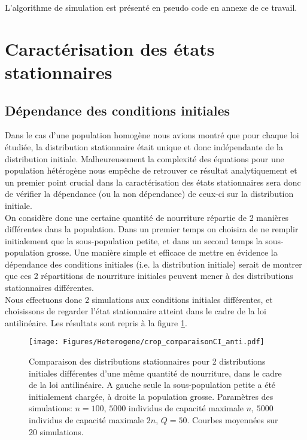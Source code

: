 L'algorithme de simulation est présenté en pseudo code en annexe de ce travail. \\


\section{Caractérisation des états stationnaires}

\subsection{Dépendance des conditions initiales}
Dans le cas d'une population homogène nous avions montré que pour chaque loi étudiée, la distribution stationnaire était unique et donc indépendante de la distribution initiale. Malheureusement la complexité des équations pour une population hétérogène nous empêche de retrouver ce résultat analytiquement et un premier point crucial dans la caractérisation des états stationnaires sera donc de vérifier la dépendance (ou la non dépendance) de ceux-ci sur la distribution initiale.\\

On considère donc une certaine quantité de nourriture répartie de 2 manières différentes dans la population. Dans un premier temps on choisira de ne remplir initialement que la sous-population petite, et dans un second temps la sous-population grosse. Une manière simple et efficace de mettre en évidence la dépendance des conditions initiales (i.e. la distribution initiale) serait de montrer que ces 2 répartitions de nourriture initiales peuvent mener à des distributions stationnaires différentes. \\

Nous effectuons donc 2 simulations aux conditions initiales différentes, et choisissons de regarder l'état stationnaire atteint dans le cadre de la loi antilinéaire. Les résultats sont repris à la figure  \ref{comparaison_CI_anti}.\\

\begin{figure}[h!]
\centering
\texttt{[image: Figures/Heterogene/crop\_comparaisonCI\_anti.pdf]}
\caption{Comparaison des distributions stationnaires pour 2 distributions initiales différentes d'une même quantité de nourriture, dans le cadre de la loi antilinéaire. A gauche seule la sous-population petite a été initialement chargée, à droite la population grosse. Paramètres des simulations: $n=100$, $5000$ individus de capacité maximale $n$, $5000$ individus de capacité maximale $2n$, $Q = 50$. Courbes moyennées sur 20 simulations.}
\label{comparaison_CI_anti}
\end{figure}

